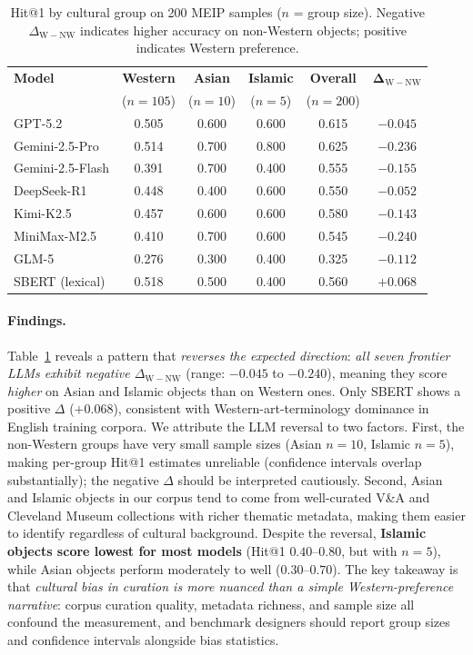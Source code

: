 \documentclass[11pt]{article}
\newcommand{\meip}{\textsc{MEIP}}
\begin{document}
\begin{table}[!t]
\centering\small
\setlength{\tabcolsep}{6pt}
\begin{tabular}{@{}lccccc@{}}
\toprule
\textbf{Model} &
  \textbf{Western} &
  \textbf{Asian} &
  \textbf{Islamic} &
  \textbf{Overall} &
  $\boldsymbol{\Delta_{\mathrm{W{-}NW}}}$ \\
 & ($n{=}105$) & ($n{=}10$) & ($n{=}5$) & ($n{=}200$) & \\
\midrule
GPT-5.2           & 0.505 & 0.600 & 0.600 & 0.615 & $-0.045$ \\
Gemini-2.5-Pro    & 0.514 & 0.700 & 0.800 & 0.625 & $-0.236$ \\
Gemini-2.5-Flash  & 0.391 & 0.700 & 0.400 & 0.555 & $-0.155$ \\
DeepSeek-R1       & 0.448 & 0.400 & 0.600 & 0.550 & $-0.052$ \\
Kimi-K2.5         & 0.457 & 0.600 & 0.600 & 0.580 & $-0.143$ \\
MiniMax-M2.5      & 0.410 & 0.700 & 0.600 & 0.545 & $-0.240$ \\
GLM-5             & 0.276 & 0.300 & 0.400 & 0.325 & $-0.112$ \\
\midrule
SBERT (lexical)   & 0.518 & 0.500 & 0.400 & 0.560 & $+0.068$ \\
\bottomrule
\end{tabular}
\caption{Hit@1 by cultural group on 200 \meip{} samples ($n$ = group size). Negative $\Delta_{\mathrm{W-NW}}$ indicates higher accuracy on non-Western objects; positive indicates Western preference.}
\label{tab:cultural-bias}
\end{table}

\paragraph{Findings.}
Table~\ref{tab:cultural-bias} reveals a pattern that \emph{reverses the expected direction}:
\emph{all seven frontier LLMs exhibit negative $\Delta_{\mathrm{W{-}NW}}$}
(range: $-0.045$ to $-0.240$), meaning they score \emph{higher} on Asian and Islamic
objects than on Western ones.
Only SBERT shows a positive $\Delta$ ($+0.068$), consistent with
Western-art-terminology dominance in English training corpora.
We attribute the LLM reversal to two factors.
First, the non-Western groups have very small sample sizes
(Asian $n{=}10$, Islamic $n{=}5$), making per-group Hit@1 estimates
unreliable (confidence intervals overlap substantially); the negative
$\Delta$ should be interpreted cautiously.
Second, Asian and Islamic objects in our corpus tend to come from
well-curated V\&A and Cleveland Museum collections with richer thematic
metadata, making them easier to identify regardless of cultural background.
Despite the reversal, \textbf{Islamic objects score lowest for most models}
(Hit@1 $0.40$--$0.80$, but with $n{=}5$),
while Asian objects perform moderately to well ($0.30$--$0.70$).
The key takeaway is that \emph{cultural bias in curation is more nuanced
than a simple Western-preference narrative}: corpus curation quality,
metadata richness, and sample size all confound the measurement,
and benchmark designers should report group sizes and confidence intervals
alongside bias statistics.
\end{document}

